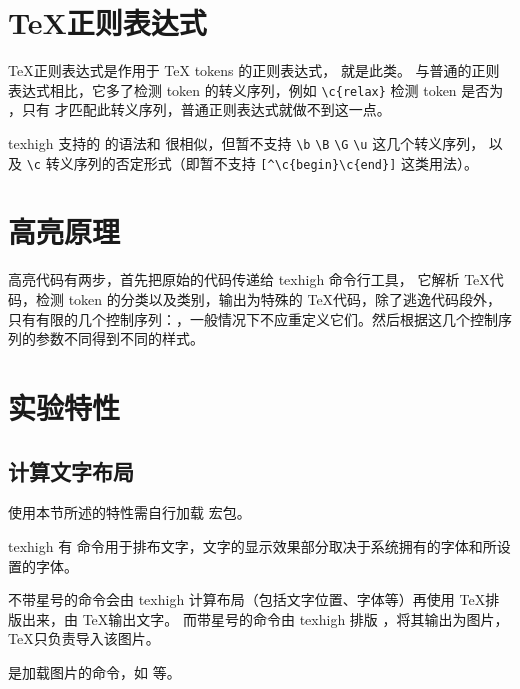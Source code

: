 \documentclass[class=article,openany]{cusdoc}[2025/10/10]
\begin{document}
\section{\TeX 正则表达式}\label{sec:regtex}

\TeX 正则表达式是作用于 {\TeX} tokens 的正则表达式， 就是此类。
与普通的正则表达式相比，它多了检测 token 的转义序列，例如 \verb|\c{relax}| 检测 token
是否为 ，只有  才匹配此转义序列，普通正则表达式就做不到这一点。

texhigh 支持的  的语法和 \autocite{l3kernel} 很相似，但暂不支持
\verb|\b| \verb|\B| \verb|\G| \verb|\u| 这几个转义序列，
以及 \verb|\c| 转义序列的否定形式（即暂不支持 \verb|[^\c{begin}\c{end}]| 这类用法）。


\section{高亮原理}

 高亮代码有两步，首先把原始的代码传递给 texhigh 命令行工具，
它解析 \TeX 代码，检测 token 的分类以及类别，输出为特殊的 \TeX 代码，除了逃逸代码段外，
只有有限的几个控制序列：{\makeatletter{}}，一般情况下不应重定义它们。然后根据这几个控制序列的参数不同得到不同的样式。


\section{实验特性}

\subsection{计算文字布局}

使用本节所述的特性需自行加载  宏包\autocite{fontspec}。

texhigh 有  命令用于排布文字，文字的显示效果部分取决于系统拥有的字体和所设置的字体。
\begin{function}{\kaomoji}
  \begin{syntax}
    \V\kaomoji   {} 
    \V\kaomoji *   
  \end{syntax}
不带星号的命令会由 texhigh 计算布局（包括文字位置、字体等）再使用 \TeX 排版出来，由 \TeX 输出文字。
而带星号的命令由 texhigh 排版 ，将其输出为图片，\TeX 只负责导入该图片。

 是加载图片的命令，如  等。
\end{function}
\end{document}

